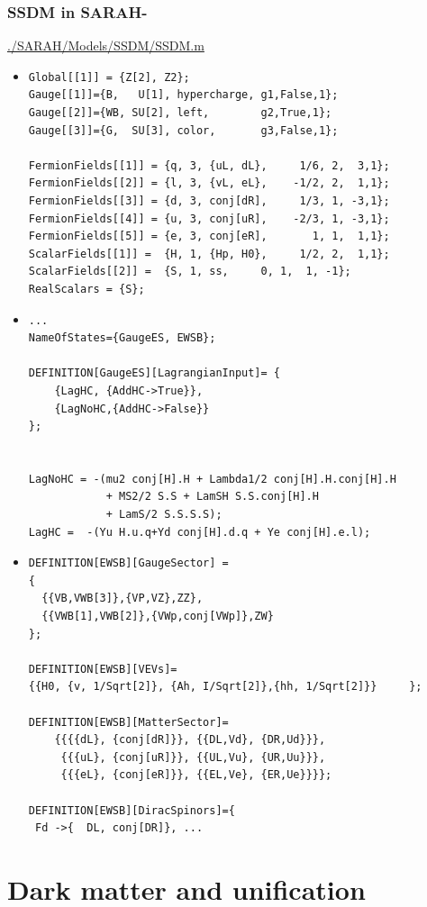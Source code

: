 \documentclass[%
xcolor=dvipsnames,table%
]{beamer}
\begin{document}
\begin{frame}
  \frametitle{SSDM in SARAH-}
\url{./SARAH/Models/SSDM/SSDM.m}
  \begin{itemize} 
  \item<1> \footnotesize
\begin{verbatim}
Global[[1]] = {Z[2], Z2};
Gauge[[1]]={B,   U[1], hypercharge, g1,False,1};
Gauge[[2]]={WB, SU[2], left,        g2,True,1};
Gauge[[3]]={G,  SU[3], color,       g3,False,1};

FermionFields[[1]] = {q, 3, {uL, dL},     1/6, 2,  3,1};  
FermionFields[[2]] = {l, 3, {vL, eL},    -1/2, 2,  1,1};
FermionFields[[3]] = {d, 3, conj[dR],     1/3, 1, -3,1};
FermionFields[[4]] = {u, 3, conj[uR],    -2/3, 1, -3,1};
FermionFields[[5]] = {e, 3, conj[eR],       1, 1,  1,1};
ScalarFields[[1]] =  {H, 1, {Hp, H0},     1/2, 2,  1,1};
ScalarFields[[2]] =  {S, 1, ss,     0, 1,  1, -1};
RealScalars = {S};
\end{verbatim}
  \item<2> \footnotesize
\begin{verbatim}
...
NameOfStates={GaugeES, EWSB};

DEFINITION[GaugeES][LagrangianInput]= {
	{LagHC, {AddHC->True}},
	{LagNoHC,{AddHC->False}}
};


LagNoHC = -(mu2 conj[H].H + Lambda1/2 conj[H].H.conj[H].H 
            + MS2/2 S.S + LamSH S.S.conj[H].H  
            + LamS/2 S.S.S.S);
LagHC =  -(Yu H.u.q+Yd conj[H].d.q + Ye conj[H].e.l);

\end{verbatim}
  \item<2> \footnotesize
\begin{verbatim}
DEFINITION[EWSB][GaugeSector] =
{ 
  {{VB,VWB[3]},{VP,VZ},ZZ},
  {{VWB[1],VWB[2]},{VWp,conj[VWp]},ZW}
};     

DEFINITION[EWSB][VEVs]= 
{{H0, {v, 1/Sqrt[2]}, {Ah, I/Sqrt[2]},{hh, 1/Sqrt[2]}}     };

DEFINITION[EWSB][MatterSector]=   
    {{{{dL}, {conj[dR]}}, {{DL,Vd}, {DR,Ud}}},
     {{{uL}, {conj[uR]}}, {{UL,Vu}, {UR,Uu}}},
     {{{eL}, {conj[eR]}}, {{EL,Ve}, {ER,Ue}}}};  

DEFINITION[EWSB][DiracSpinors]={
 Fd ->{  DL, conj[DR]}, ...
\end{verbatim}
  \end{itemize}
\end{frame}



\section{Dark matter and unification}
\end{document}
